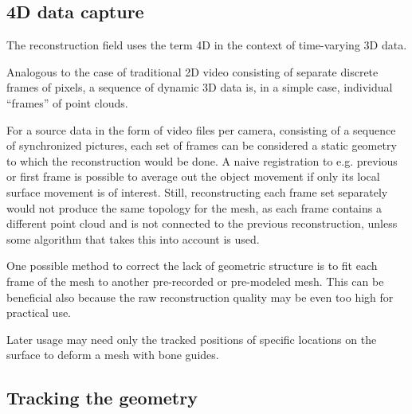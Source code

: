 

\subsection{4D data capture} %

The reconstruction field uses the term 4D in the context of time-varying 3D data.

Analogous to the case of traditional 2D video consisting of separate discrete frames of pixels, a sequence of dynamic 3D data is, in a simple case, individual ``frames'' of point clouds.

For a source data in the form of video files per camera, consisting of a sequence of synchronized pictures, each set of frames can be considered a static geometry to which the reconstruction would be done.
A naive registration to e.g. previous or first frame is possible to average out the object movement if only its local surface movement is of interest.
Still, reconstructing each frame set separately would not produce the same topology for the mesh, as each frame contains a different point cloud and is not connected to the previous reconstruction, unless some algorithm that takes this into account is used.

One possible method to correct the lack of geometric structure is to fit each frame of the mesh to another pre-recorded or pre-modeled mesh. \cite{somewhere,remedysoftware?}
This can be beneficial also because the raw reconstruction quality may be even too high for practical use.

Later usage may need only the tracked positions of specific locations on the surface to deform a mesh with bone guides.


\subsection{Tracking the geometry} %




